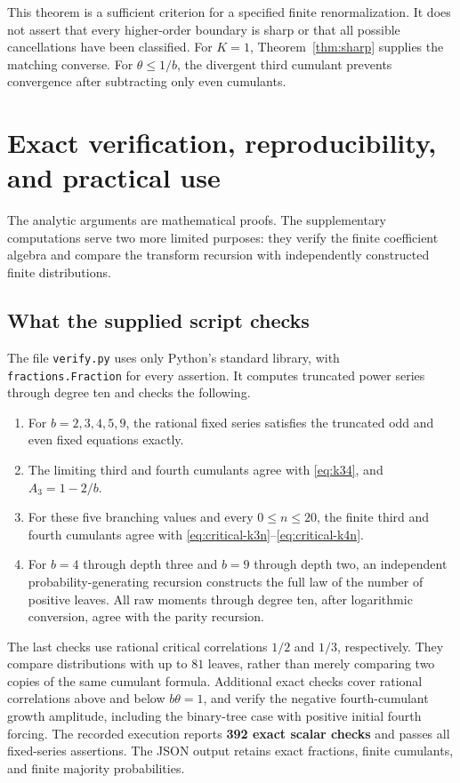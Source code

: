 \documentclass[11pt]{article}
\theoremstyle{definition}
\begin{document}
This theorem is a sufficient criterion for a specified finite
renormalization. It does not assert that every higher-order boundary
is sharp or that all possible cancellations have been classified.
For $K=1$, Theorem~\ref{thm:sharp} supplies the matching converse.
For $\theta\leq1/b$, the divergent third cumulant prevents convergence
after subtracting only even cumulants.

\section{Exact verification, reproducibility, and practical use}

The analytic arguments are mathematical proofs. The supplementary
computations serve two more limited purposes: they verify the finite
coefficient algebra and compare the transform recursion with independently
constructed finite distributions.

\subsection{What the supplied script checks}

The file \texttt{verify.py} uses only Python's standard library, with
\texttt{fractions.Fraction} for every assertion. It computes truncated
power series through degree ten and checks the following.
\begin{enumerate}[leftmargin=*,itemsep=3pt]
\item For $b=2,3,4,5,9$, the rational fixed series satisfies the
      truncated odd and even fixed equations exactly.
\item The limiting third and fourth cumulants agree with
      \eqref{eq:k34}, and $A_3=1-2/b$.
\item For these five branching values and every $0\leq n\leq20$,
      the finite third and fourth cumulants agree with
      \eqref{eq:critical-k3n}--\eqref{eq:critical-k4n}.
\item For $b=4$ through depth three and $b=9$ through depth two,
      an independent probability-generating recursion constructs the
      full law of the number of positive leaves. All raw moments
      through degree ten, after logarithmic conversion, agree with
      the parity recursion.
\end{enumerate}
The last checks use rational critical correlations $1/2$ and $1/3$,
respectively. They compare distributions with up to $81$ leaves, rather
than merely comparing two copies of the same cumulant formula.
Additional exact checks cover rational correlations above and below
$b\theta=1$, and verify the negative fourth-cumulant growth amplitude,
including the binary-tree case with positive initial fourth forcing.
The recorded execution reports \textbf{392 exact scalar checks} and
passes all fixed-series assertions. The JSON output retains exact
fractions, finite cumulants, and finite majority probabilities.
\end{document}
